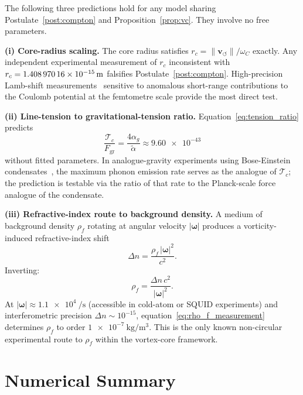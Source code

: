 \documentclass[aps,pra,preprint,longbibliography,nofootinbib]{revtex4-2}
\newcommand{\vnorm}{\lVert\mathbf{v}_{\!\boldsymbol{\circlearrowleft}}\rVert} %
\newcommand{\rhof}{\rho_{\!f}}                   %
\newcommand{\rc}{r_c}                            %
\newcommand{\omC}{\omega_C}                      %
\newcommand{\Tc}{\mathcal{T}_c}                  %
\newcommand{\Fgr}{F_{\mathrm{gr}}}              %
\begin{document}
The following three predictions hold for any model sharing
Postulate~\ref{post:compton} and Proposition~\ref{prop:vc}.
They involve no free parameters.

\medskip
\noindent\textbf{(i) Core-radius scaling.}
The core radius satisfies $\rc = \vnorm/\omC$ exactly.
Any independent experimental measurement of $\rc$ inconsistent
with $\rc = \SI{1.408\,970\,16e-15}{\meter}$ falsifies
Postulate~\ref{post:compton}.
High-precision Lamb-shift measurements~\cite{Bethe1947,Karshenboim2005}
sensitive to anomalous short-range contributions to the Coulomb
potential at the femtometre scale provide the most direct test.

\medskip
\noindent\textbf{(ii) Line-tension to gravitational-tension ratio.}
Equation~\eqref{eq:tension_ratio} predicts
\begin{equation}
  \frac{\Tc}{\Fgr} = \frac{4\alpha_g}{\tilde\alpha}
  \approx \num{9.60e-43}
  \label{eq:pred2}
\end{equation}
without fitted parameters.
In analogue-gravity experiments using Bose-Einstein
condensates~\cite{Barcelo2005}, the maximum phonon emission rate
serves as the analogue of $\Tc$; the prediction is testable via the
ratio of that rate to the Planck-scale force analogue of the
condensate.

\medskip
\noindent\textbf{(iii) Refractive-index route to background density.}
A medium of background density $\rhof$ rotating at angular velocity
$|\boldsymbol{\omega}|$ produces a vorticity-induced refractive-index
shift
\begin{equation}
  \Delta n = \frac{\rhof\,|\boldsymbol{\omega}|^2}{c^2}.
  \label{eq:refraction}
\end{equation}
Inverting:
\begin{equation}
  \rhof = \frac{\Delta n\,c^2}{|\boldsymbol{\omega}|^2}.
  \label{eq:rho_f_measurement}
\end{equation}
At $|\boldsymbol{\omega}| \approx \SI{1.1e4}{\per\second}$
(accessible in cold-atom or SQUID experiments) and interferometric
precision $\Delta n \sim 10^{-15}$,
equation~\eqref{eq:rho_f_measurement} determines $\rhof$ to
order $\SI{1e-7}{\kilogram\per\cubic\meter}$.
This is the only known non-circular experimental route to $\rhof$
within the vortex-core framework.

\section{Numerical Summary}
\label{sec:numerical}
\end{document}
